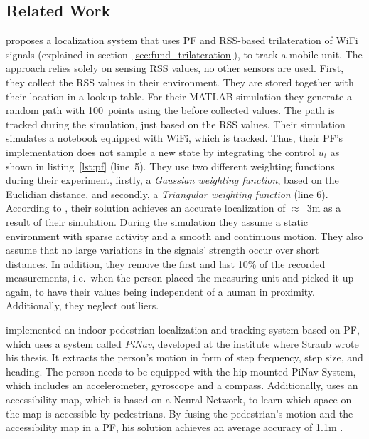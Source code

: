 \subsection{Related Work}

\citet{Siddiqui:tracking} proposes a localization system that uses \ac{PF} and \ac{RSS}-based trilateration of WiFi signals (explained in section~\ref{sec:fund_trilateration}), to track a mobile unit. The approach relies solely on sensing \ac{RSS} values, no other sensors are used. First, they collect the \ac{RSS} values in their environment. They are stored together with their location in a lookup table. For their MATLAB simulation they generate a random path with 100~points using the before collected values. The path is tracked during the simulation, just based on the \ac{RSS} values. Their simulation simulates a notebook equipped with WiFi, which is tracked. Thus, their \ac{PF}'s implementation does not sample a new state by integrating the control $u_t$ as shown in listing~\ref{lst:pf} (line~5). They use two different weighting functions during their experiment, firstly, a \emph{Gaussian weighting function}, based on the Euclidian distance, and secondly, a \emph{Triangular weighting function} (line 6). According to \citet{Siddiqui:tracking}, their solution achieves an accurate localization of $\approx$~3m as a result of their simulation. During the simulation they assume a static environment with sparse activity and a smooth and continuous motion. They also assume that no large variations in the signals' strength occur over short distances. In addition, they remove the first and last 10\% of the recorded measurements, i.e.\ when the person placed the measuring unit and picked it up again, to have their values being independent of a human in proximity. Additionally, they neglect outlliers.

\citet{straub:pf} implemented an indoor pedestrian localization and tracking system based on \ac{PF}, which uses a system called \emph{PiNav}, developed at the institute where Straub wrote his thesis. It extracts the person's motion in form of step frequency, step size, and heading. The person needs to be equipped with the hip-mounted PiNav-System, which includes an accelerometer, gyroscope and a compass. Additionally, \citet{straub:pf} uses an accessibility map, which is based on a Neural Network, to learn which space on the map is accessible by pedestrians. By fusing the pedestrian's motion and the accessibility map in a \ac{PF}, his solution achieves an average accuracy of 1.1m \citep{straub:pf}.


